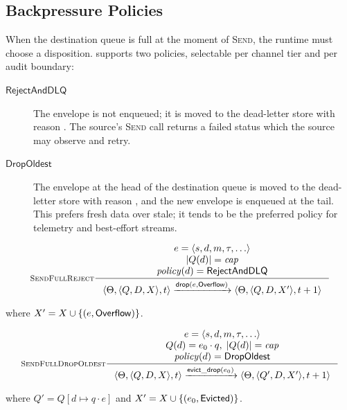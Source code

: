 \subsection{Backpressure Policies}
\label{sec:k2k:backpressure}

When the destination queue is full at the moment of \textsc{Send}, the
runtime must choose a disposition.  \system{} supports two policies,
selectable per channel tier and per audit boundary:

\begin{description}
\item[\(\mathsf{RejectAndDLQ}\)] The envelope is not enqueued; it is
moved to the dead-letter store with reason
.  The source's \textsc{Send} call returns a failed
status which the source may observe and retry.

\item[\(\mathsf{DropOldest}\)] The envelope at the head of the
destination queue is moved to the dead-letter store with reason
, and the new envelope is enqueued at the tail.  This
prefers fresh data over stale; it tends to be the preferred policy
for telemetry and best-effort streams.
\end{description}

\begin{equation}
\inference[\textsc{SendFullReject}]
{
  e = \langle s, d, m, \tau, \ldots\rangle \\
  |Q(d)| = \mathit{cap} \\
  \mathit{policy}(d) = \mathsf{RejectAndDLQ}
}
{
  \langle \Theta, \langle Q, D, X\rangle, t\rangle
  \trans{\mathsf{drop}(e, \state{Overflow})}
  \langle \Theta, \langle Q, D, X'\rangle, t+1\rangle
}
\label{rule:k2k-send-reject}
\end{equation}

\noindent where \(X' = X \cup \{(e, \mathsf{Overflow})\}\).

\begin{equation}
\inference[\textsc{SendFullDropOldest}]
{
  e = \langle s, d, m, \tau, \ldots\rangle \\
  Q(d) = e_0 \cdot q,\; |Q(d)| = \mathit{cap} \\
  \mathit{policy}(d) = \mathsf{DropOldest}
}
{
  \langle \Theta, \langle Q, D, X\rangle, t\rangle
  \trans{\mathsf{evict\_drop}(e_0)}
  \langle \Theta, \langle Q', D, X'\rangle, t+1\rangle
}
\label{rule:k2k-send-evict}
\end{equation}

\noindent where \(Q' = Q[d \mapsto q \cdot e]\) and
\(X' = X \cup \{(e_0, \mathsf{Evicted})\}\).

